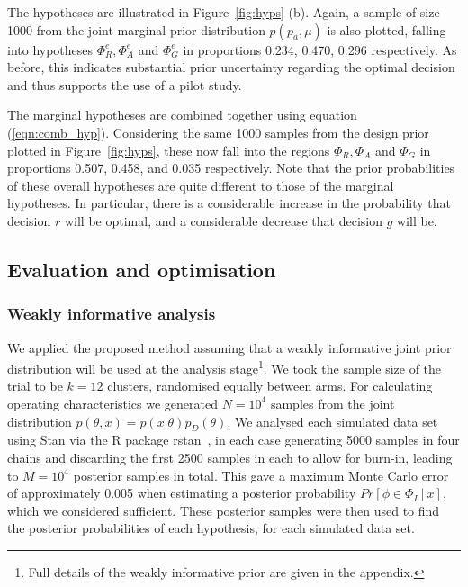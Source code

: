 \documentclass[AMA,STIX1COL]{WileyNJD-v2}
\begin{document}
The hypotheses are illustrated in Figure~\ref{fig:hyps} (b). Again, a sample of size 1000 from the joint marginal prior distribution $p(p_{a}, \mu)$ is also plotted, falling into hypotheses $\Phi^e_R, \Phi^e_A$ and $\Phi^e_G$ in proportions 0.234, 0.470, 0.296 respectively. As before, this indicates substantial prior uncertainty regarding the optimal decision and thus supports the use of a pilot study.

The marginal hypotheses are combined together using equation (\ref{eqn:comb_hyp}). Considering the same 1000 samples from the design prior plotted in Figure~\ref{fig:hyps}, these now fall into the regions $\Phi_R, \Phi_A$ and $\Phi_G$ in proportions 0.507, 0.458, and 0.035 respectively. Note that the prior probabilities of these overall hypotheses are quite different to those of the marginal hypotheses. In particular, there is a considerable increase in the probability that decision $r$ will be optimal, and a considerable decrease that decision $g$ will be.

\subsection{Evaluation and optimisation}

\subsubsection{Weakly informative analysis}

We applied the proposed method assuming that a weakly informative joint prior distribution will be used at the analysis stage\footnote{Full details of the weakly informative prior are given in the appendix.}. We took the sample size of the trial to be $k = 12$ clusters, randomised equally between arms. For calculating operating characteristics we generated $N = 10^4$ samples from the joint distribution $p(\theta, x) = p(x | \theta)p_D(\theta)$. We analysed each simulated data set using Stan via the R package rstan~\cite{rstan}, in each case generating 5000 samples in four chains and discarding the first 2500 samples in each to allow for burn-in, leading to $M = 10^4$ posterior samples in total. This gave a maximum Monte Carlo error of approximately 0.005 when estimating a posterior probability $Pr[\phi \in \Phi_I ~|~ x]$, which we considered sufficient. These posterior samples were then used to find the posterior probabilities of each hypothesis, for each simulated data set.

\end{document}
